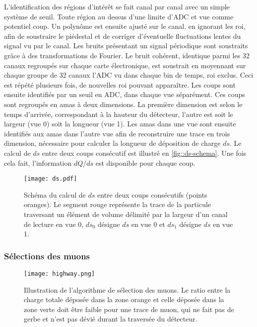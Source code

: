         L'identification des régions d'intérêt se fait canal par canal avec un simple  système de seuil. Toute région au dessus d'une limite d'ADC et vue comme potentiel coup. Un polynôme est ensuite ajusté sur le canal, en ignorant les \gls{roi}, afin de soustraire le piédestal et de corriger d'éventuelle fluctuations lentes du signal vu par le canal. Les bruits présentant un signal périodique sont soustraits grâce à des transformations de Fourier. Le bruit cohérent, identique parmi les 32 canaux regroupés sur chaque carte électronique, est soustrait en moyennant sur chaque groupe de 32 canaux l'ADC vu dans chaque bin de temps, \gls{roi} exclus. Ceci est répété plusieurs fois, de nouvelles \gls{roi} pouvant apparaître. Les coups sont ensuite identifiés par un seuil en ADC, dans chaque vue séparément. Ces coups sont regroupés en amas à deux dimensions. La première dimension est selon le temps d'arrivée, correspondant à la hauteur du détecteur, l'autre est soit le largeur (vue 0) soit la longueur (vue 1). Les amas dans une vue sont ensuite identifiés aux amas dans l'autre vue afin de reconstruire une trace en trois dimension, nécessaire pour calculer la longueur de déposition de charge $ds$. Le calcul de $ds$ entre deux coups consécutif est illustré en \autoref{fig::ds-schema}. Une fois cela fait, l'information $dQ/ds$ est disponible pour chaque coup.

        \begin{figure}[htbp]
          \centering
          \texttt{[image: ds.pdf]}
          \caption[Schéma du calcul de $ds$.]{\label{fig::ds-schema}Schéma du calcul de $ds$ entre deux coups consécutifs (points oranges). Le segment rouge représente la trace de la particule traversant un élément de volume délimité par la largeur d'un canal de lecture en vue 0, $ds_0$ désigne $ds$ en vue 0 et $ds_1$ désigne $ds$ en vue 1.}
        \end{figure}

      \subsubsection{Sélections des muons}\label{sec::selection}

        \begin{figure}[htbp]
          \centering
          \texttt{[image: highway.png]}
          \caption[Illustration de l'algorithme de sélection des muons.]{\label{fig::highway}Illustration de l'algorithme de sélection des muons. Le ratio entre la charge totale déposée dans la zone orange et celle déposée dans la zone verte doit être faible pour une trace de muon, qui ne fait pas de gerbe et n'est pas dévié durant la traversée du détecteur.}
        \end{figure}

